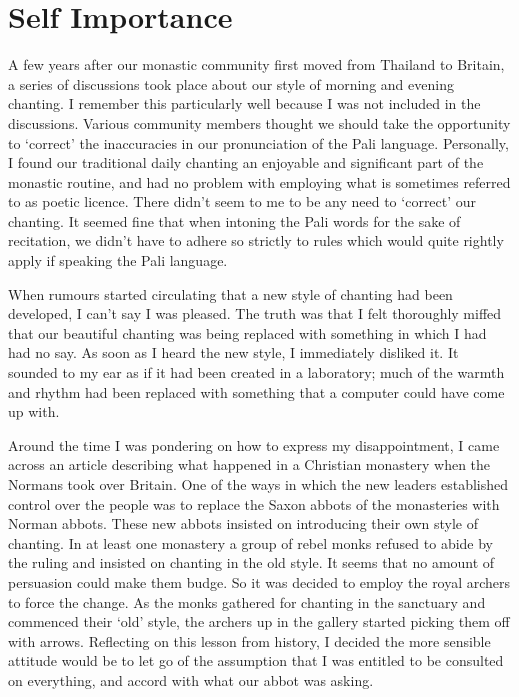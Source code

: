 \section{Self Importance}

A few years after our monastic community first moved from Thailand to
Britain, a series of discussions took place about our style of morning
and evening chanting. I remember this particularly well because I was
not included in the discussions. Various community members thought we
should take the opportunity to ‘correct’ the inaccuracies in our
pronunciation of the Pali language. Personally, I found our traditional
daily chanting an enjoyable and significant part of the monastic
routine, and had no problem with employing what is sometimes referred to
as poetic licence. There didn’t seem to me to be any need to ‘correct’
our chanting. It seemed fine that when intoning the Pali words for the
sake of recitation, we didn’t have to adhere so strictly to rules which
would quite rightly apply if speaking the Pali language.

When rumours started circulating that a new style of chanting had been
developed, I can’t say I was pleased. The truth was that I felt
thoroughly miffed that our beautiful chanting was being replaced with
something in which I had had no say. As soon as I heard the new style, I
immediately disliked it. It sounded to my ear as if it had been created
in a laboratory; much of the warmth and rhythm had been replaced with
something that a computer could have come up with.

Around the time I was pondering on how to express my disappointment, I
came across an article describing what happened in a Christian monastery
when the Normans took over Britain. One of the ways in which the new
leaders established control over the people was to replace the Saxon
abbots of the monasteries with Norman abbots. These new abbots insisted
on introducing their own style of chanting. In at least one monastery a
group of rebel monks refused to abide by the ruling and insisted on
chanting in the old style. It seems that no amount of persuasion could
make them budge. So it was decided to employ the royal archers to force
the change. As the monks gathered for chanting in the sanctuary and
commenced their ‘old’ style, the archers up in the gallery started
picking them off with arrows. Reflecting on this lesson from history, I
decided the more sensible attitude would be to let go of the assumption
that I was entitled to be consulted on everything, and accord with what
our abbot was asking.

